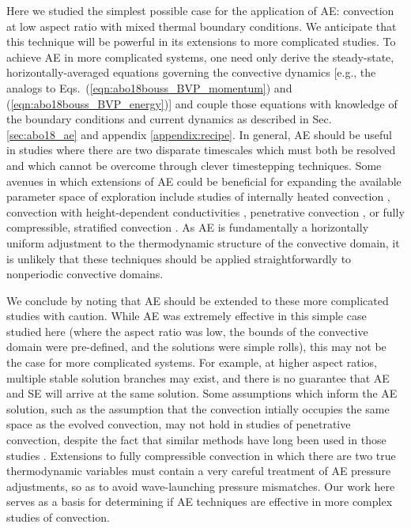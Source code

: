 Here we studied the simplest possible case for the application of AE: \RB convection at low aspect ratio with mixed thermal boundary conditions. 
We anticipate that this technique will be powerful in its extensions to more complicated studies.
To achieve AE in more complicated systems, one need only derive the steady-state, horizontally-averaged equations governing the convective dynamics [e.g., the analogs to Eqs.~(\ref{eqn:abo18bouss_BVP_momentum}) and (\ref{eqn:abo18bouss_BVP_energy})] and couple those equations with knowledge of the boundary conditions and current dynamics as described in Sec. \ref{sec:abo18_ae} and appendix \ref{appendix:recipe}.
In general, AE should be useful in studies where there are two disparate timescales which must both be resolved and which cannot be overcome through clever timestepping techniques.  
Some avenues in which extensions of AE could be beneficial for expanding the available parameter space of exploration include studies of internally heated convection \citep{goluskin2016}, convection with height-dependent conductivities \citep{kapyla&all2017}, penetrative convection \citep{hurlburt&all1986,brandenburg&all2005,couston&all2017}, or fully compressible, stratified convection \citep{anders&brown2017}.
As AE is fundamentally a horizontally uniform adjustment to the thermodynamic structure of the convective domain, it is unlikely that these techniques should be applied straightforwardly to nonperiodic convective domains.

We conclude by noting that AE should be extended to these more complicated studies with caution. 
While AE was extremely effective in this simple case studied here (where the aspect ratio was low,  the bounds of the convective domain were pre-defined, and the solutions were simple rolls), this may not be the case for more complicated systems. 
For example, at higher aspect ratios, multiple stable solution branches may exist, and there is no guarantee that AE and SE will arrive at the same solution. 
Some assumptions which inform the AE solution, such as the assumption that the convection intially occupies the same space as the evolved convection, may not hold in studies of penetrative convection, despite the fact that similar methods have long been used in those studies \citep{hurlburt&all1986}. 
Extensions to fully compressible convection in which there are two true thermodynamic variables \citep{anders&brown2017} must contain a very careful treatment of AE pressure adjustments, so as to avoid wave-launching pressure mismatches.
Our work here serves as a basis for determining if AE techniques are effective in more complex studies of convection.


